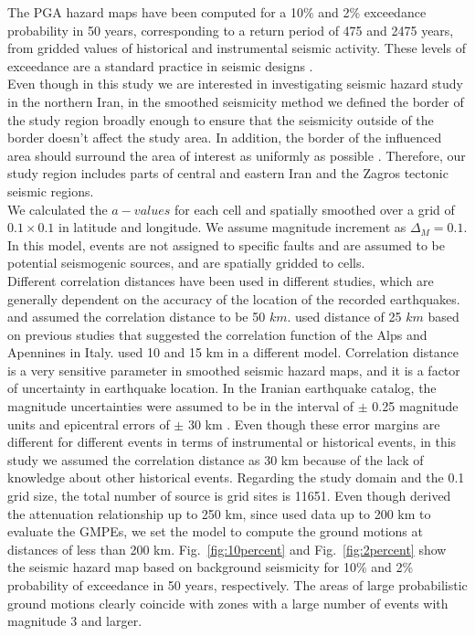 \documentclass{article}
\begin{document}
The PGA hazard maps have been computed for a 10\% and 2\% exceedance probability in 50 years, corresponding to a return period of 475 and 2475 years, from gridded values of historical and instrumental seismic activity. These levels of exceedance are a standard practice in seismic designs \citep{BHRC2014}.\\
\noindent
Even though in this study we are interested in investigating seismic hazard study in the northern Iran, in the smoothed seismicity method we defined the border of the study region broadly enough to ensure that the seismicity outside of the border doesn't affect the study area.  In addition, the border of the influenced area should surround the area of interest as uniformly as possible \citep{Lapajne1997}. Therefore, our study region includes parts of central and eastern Iran and the Zagros tectonic seismic regions.\\
\noindent
We calculated the $a-values$ for each cell and spatially smoothed over a grid of $0.1 \times 0.1$ in latitude and longitude. We assume magnitude increment as $\Delta_M = 0.1$. In this model, events are not assigned to specific faults and are assumed to be potential seismogenic sources, and are spatially gridded to cells. \\
\noindent
Different correlation distances have been used in different studies, which are generally dependent on the accuracy of the location of the recorded earthquakes. \citet{Frankel1995} and \citet{Boyd2008} assumed the correlation distance to be 50 $km$. \citet{Barani2007} used distance of 25 $km$ based on previous studies that suggested the correlation function of the Alps and Apennines in Italy. \citet{Foteva2006} used 10 and 15 km in a different model. Correlation distance is a very sensitive parameter in smoothed seismic hazard maps, and it is a factor of uncertainty in earthquake location. In the Iranian earthquake catalog, the magnitude uncertainties were assumed to be in the interval of $\pm$ 0.25 magnitude units and epicentral errors of $\pm$ 30 km \citep{Zare2012}. Even though these error margins are different for different events in terms of instrumental or historical events, in this study we assumed the correlation distance as 30 km because of the lack of knowledge about other historical events. Regarding the study domain and the 0.1 grid size, the total number of source is grid sites is 11651. Even though \citet{Kalkan2004} derived the attenuation relationship up to 250 km, since \citet{Zafarani2014} used data up to 200 km to evaluate the GMPEs, we set the model to compute the ground motions at distances of less than 200 km.
Fig.~\ref{fig:10percent} and Fig.~\ref{fig:2percent} show the seismic hazard map based on background seismicity for 10\% and 2\% probability of exceedance in 50 years, respectively. The areas of large probabilistic ground motions clearly coincide with zones with a large number of events with magnitude 3 and larger.
\end{document}
